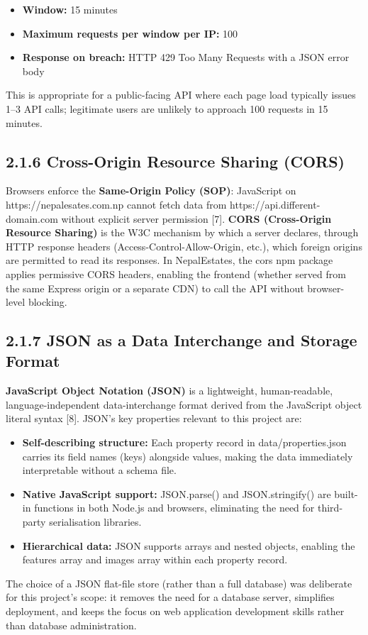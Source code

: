 \documentclass[12pt,a4paper]{report}
\begin{document}
\begin{itemize}
  \item \textbullet{} \textbf{Window:} 15 minutes
  \item \textbullet{} \textbf{Maximum requests per window per IP:} 100
  \item \textbullet{} \textbf{Response on breach:} HTTP 429 Too Many Requests with a JSON error body
\end{itemize}
This is appropriate for a public-facing API where each page load typically issues 1--3 API calls; legitimate users are unlikely to approach 100 requests in 15 minutes.

\subsection{2.1.6 Cross-Origin Resource Sharing (CORS)}
Browsers enforce the \textbf{Same-Origin Policy (SOP)}: JavaScript on https://nepalesates.com.np cannot fetch data from https://api.different-domain.com without explicit server permission [7]. \textbf{CORS (Cross-Origin Resource Sharing)} is the W3C mechanism by which a server declares, through HTTP response headers (Access-Control-Allow-Origin, etc.), which foreign origins are permitted to read its responses. In NepalEstates, the cors npm package applies permissive CORS headers, enabling the frontend (whether served from the same Express origin or a separate CDN) to call the API without browser-level blocking.

\subsection{2.1.7 JSON as a Data Interchange and Storage Format}
\textbf{JavaScript Object Notation (JSON)} is a lightweight, human-readable, language-independent data-interchange format derived from the JavaScript object literal syntax [8]. JSON's key properties relevant to this project are:

\begin{itemize}
  \item \textbullet{} \textbf{Self-describing structure:} Each property record in data/properties.json carries its field names (keys) alongside values, making the data immediately interpretable without a schema file.
  \item \textbullet{} \textbf{Native JavaScript support:} JSON.parse() and JSON.stringify() are built-in functions in both Node.js and browsers, eliminating the need for third-party serialisation libraries.
  \item \textbullet{} \textbf{Hierarchical data:} JSON supports arrays and nested objects, enabling the features array and images array within each property record.
\end{itemize}
The choice of a JSON flat-file store (rather than a full database) was deliberate for this project's scope: it removes the need for a database server, simplifies deployment, and keeps the focus on web application development skills rather than database administration.
\end{document}
